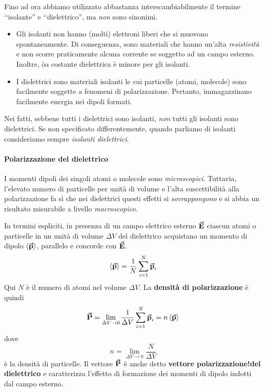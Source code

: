 Fino ad ora abbiamo utilizzato abbastanza interscambiabilmente il termine ‘‘isolante'' e ‘‘dielettrico'', ma \textit{non} sono sinonimi.
\begin{itemize}
	\item Gli isolanti non hanno (molti) elettroni liberi che si muovono spontaneamente. Di conseguenza, sono materiali che hanno un'alta \textit{resistività} e non scorre praticamente alcuna corrente se soggetto ad un campo esterno. Inoltre, òa costante dielettrica è minore per gli isolanti.
	\item I dielettrici sono materiali isolanti le cui particelle (atomi, molecole) sono facilmente soggette a fenomeni di polarizzazione. Pertanto, immagazzinano facilmente energia nei dipoli formati.
\end{itemize}
Nei fatti, sebbene tutti i dielettrici sono isolanti, \textit{non} tutti gli isolanti sono dielettrici. Se non specificato differentemente, quando parliamo di isolanti consideriamo sempre \textit{isolanti dielettrici}.
\paragraph{Polarizzazione del dielettrico}
I momenti dipoli dei singoli atomi o molecole sono \textit{microscopici}. Tuttavia, l'elevato numero di particelle per unità di volume e l'alta suscettibilità alla polarizzazione fa sì che nei dielettrici questi effetti si \textit{sovrappongono} e si abbia un risultato misurabile a livello \textit{macroscopico}.

In termini espliciti, in presenza di un campo elettrico esterno $\vb*{\va{E}}$ ciascun atomi o particelle in un unità di volume $\Delta V$ del dielettrico acquistano un momento di dipolo $\left<\vb*{\va{p}}\right>$, parallelo e concorde con $\vb*{\va{E}}$.
\begin{equation*}
	\left<\vb*{\va{p}}\right>=\frac{1}{N}\sum_{i=1}^N\vb*{\va{p}}_i
\end{equation*}
Qui $N$ è il numero di atomi nel volume $\Delta V$. La \textbf{densità di polarizzazione} è quindi
\begin{equation}
	\vb*{\va{P}}=\lim_{\Delta V\to 0}\frac{1}{\Delta V}\sum_{i=1}^{N}\vb*{\va{p}}_i=n\left<\vb*{\va{p}}\right>
\end{equation}
dove
\begin{equation*}
	n=\lim_{\Delta V\to 0}\frac{N}{\Delta V}
\end{equation*}
è la densità di particelle. Il vettore $\vb*{\va{P}}$ è anche detto \textbf{vettore polarizzazione!del dielettrico} e caratterizza l'effetto di formazione dei momenti di dipolo indotti dal campo esterno.

